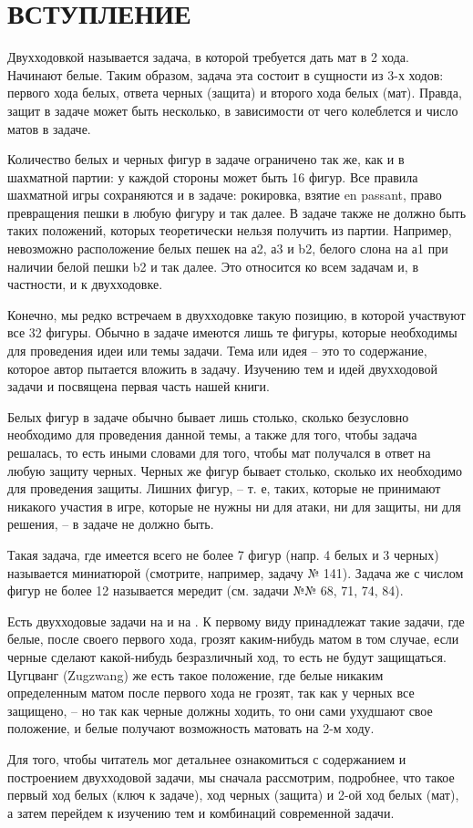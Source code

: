 \chapter*{ВСТУПЛЕНИЕ}
Двухходовкой называется задача, в которой требуется дать мат в 2 хода. Начинают белые. Таким образом, задача эта состоит в сущности из 3-х ходов: первого хода белых, ответа черных (защита) и второго хода белых (мат). Правда, защит в задаче может быть несколько, в зависимости от чего колеблется и число матов в задаче.

Количество белых и черных фигур в задаче ограничено так же, как и в шахматной партии: у каждой стороны может быть 16 фигур. Все правила шахматной игры сохраняются и в задаче: рокировка, взятие en passant, право превращения пешки в любую фигуру и так далее. В задаче также не должно быть таких положений, которых теоретически нельзя получить из партии. Например, невозможно расположение белых пешек на а2, а3 и b2, белого слона на а1 при наличии белой пешки b2 и так далее. Это относится ко всем задачам и, в частности, и к двухходовке.

Конечно, мы редко встречаем в двухходовке такую позицию, в которой участвуют все 32 фигуры. Обычно в задаче имеются лишь те фигуры, которые необходимы для проведения идеи или темы задачи. Тема или идея -- это то содержание, которое автор пытается вложить в задачу. Изучению тем и идей двухходовой задачи и посвящена первая часть нашей книги.

Белых фигур в задаче обычно бывает лишь столько, сколько безусловно необходимо для проведения данной темы, а также для того, чтобы задача решалась, то есть иными словами для того, чтобы мат получался в ответ на любую защиту черных. Черных же фигур бывает столько, сколько их необходимо для проведения защиты. Лишних фигур, -- т. е, таких, которые не принимают никакого участия в игре, которые не нужны ни для атаки, ни для защиты, ни для решения, -- в задаче не должно быть.

Такая задача, где имеется всего не более 7 фигур (напр. 4 белых и 3 черных) называется миниатюрой (смотрите, например, задачу № 141). Задача же с числом фигур не более 12 называется мередит (см. задачи №№ 68, 71, 74, 84).

Есть двухходовые задачи на  и на . К первому виду принадлежат такие задачи, где белые, после своего первого хода, грозят каким-нибудь матом в том случае, если черные сделают какой-нибудь безразличный ход, то есть не будут защищаться. Цугцванг (Zugzwang) же есть такое положение, где белые никаким определенным матом после первого хода не грозят, так как у черных все защищено, -- но так как черные должны ходить, то они сами ухудшают свое положение, и белые получают возможность матовать на 2-м ходу.

Для того, чтобы читатель мог детальнее ознакомиться с содержанием и построением двухходовой задачи, мы сначала рассмотрим, подробнее, что такое первый ход белых (ключ к задаче), ход черных (защита) и 2-ой ход белых (мат), а затем перейдем к изучению тем и комбинаций современной задачи.